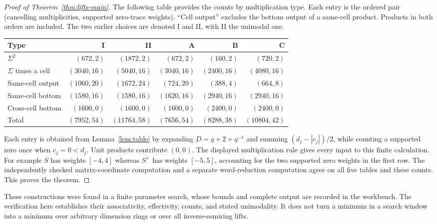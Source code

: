 \begin{proof}[Proof of Theorem~\ref{thm:lifts-main}]
The following table provides the counts by multiplication type. Each entry is the ordered pair (cancelling multiplicities, supported zero-trace weights). ``Cell output'' excludes the bottom output of a same-cell product. Products in both orders are included. The two earlier choices are denoted I and II, with II the unimodal one.
\begin{center}
\small
\begin{tabular}{lrrrrr}
\toprule
Type & I & II & A & B & C\\
\midrule
$\Sigma^2$ & $(672,2)$ & $(1872,2)$ & $(672,2)$ & $(160,2)$ & $(720,2)$\\
$\Sigma$ times a cell & $(3040,16)$ & $(5040,16)$ & $(3040,16)$ & $(2400,16)$ & $(4080,16)$\\
Same-cell output & $(1060,20)$ & $(1672,24)$ & $(724,20)$ & $(388,4)$ & $(664,8)$\\
Same-cell bottom & $(1580,16)$ & $(1580,16)$ & $(1620,16)$ & $(2940,16)$ & $(2940,16)$\\
Cross-cell bottom & $(1600,0)$ & $(1600,0)$ & $(1600,0)$ & $(2400,0)$ & $(2400,0)$\\
\midrule
Total & $(7952,54)$ & $(11764,58)$ & $(7656,54)$ & $(8288,38)$ & $(10804,42)$\\
\bottomrule
\end{tabular}
\end{center}
Each entry is obtained from Lemma~\ref{lem:table} by expanding $D=q+2+q^{-1}$ and summing $(d_j-|c_j|)/2$, while counting a supported zero once when $c_j=0<d_j$. Unit products contribute $(0,0)$. The displayed multiplication rule gives every input to this finite calculation. For example $S$ has weights $[-4,4]$ whereas $S^+$ has weights $[-5,5]$, accounting for the two supported zero weights in the first row. The independently checked matrix-coordinate computation and a separate word-reduction computation agree on all five tables and these counts. This proves the theorem.
\end{proof}

These constructions were found in a finite parameter search, whose bounds and complete output are recorded in the workbench. The verification here establishes their associativity, effectivity, counts, and stated unimodality. It does not turn a minimum in a search window into a minimum over arbitrary dimension rings or over all inverse-semiring lifts.
